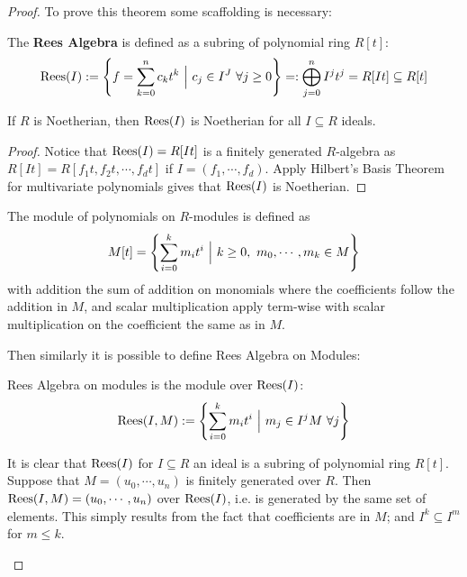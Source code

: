 \begin{proof}
    To prove this theorem some scaffolding is necessary:

    \begin{definition}
        The \textbf{Rees Algebra} is defined as a subring of polynomial ring $R[t]$:
        \[
            \mathrm{Rees}(I) := \left\{ f = \sum\limits_{k=0}^n c_k t^k \ \Big|\  c_j\in I^J\ \forall j \geq 0 \right\} =: \bigoplus\limits_{j=0}^n I^j t^j  = R[It] \subseteq R[t]
        \]
    \end{definition}

    \begin{proposition}\label{prop:Rees on Noeth is Noeth}
        If $R$ is Noetherian, then $\mathrm{Rees}(I)$ is Noetherian for all $I\subseteq R$ ideals. 
    \end{proposition}

    \begin{proof}
        Notice that $\mathrm{Rees}(I) = R[It]$ is a finitely generated $R$-algebra as $R[It] = R[f_1t, f_2t, \cdots, f_dt]$ if $I = (f_1, \cdots, f_d)$. Apply Hilbert's Basis Theorem for multivariate polynomials gives that $\mathrm{Rees}(I)$ is Noetherian.
    \end{proof}

    \begin{definition}
        The module of polynomials on $R$-modules is defined as
        \[
            M[t] = \left\{ \sum\limits_{i=0}^k m_i t^i \ \Big|\  k \geq 0,\ m_0, \cdots, m_k \in M \right\}
        \]
        with addition the sum of addition on monomials where the coefficients follow the addition in $M$, and scalar multiplication apply term-wise with scalar multiplication on the coefficient the same as in $M$. 
    \end{definition}

    Then similarly it is possible to define Rees Algebra on Modules:
    \begin{definition}
        Rees Algebra on modules is the module over $\mathrm{Rees}(I)$:
        \[
            \mathrm{Rees}(I, M) := \left\{ \sum\limits_{i=0}^k m_i t^i \ \Big|\  m_j\in I^j M \ \forall j \right\}
        \]
    \end{definition}

    \begin{remark}\label{rmk:Rees(I,M) Noeth if M Noeth}
        It is clear that $\mathrm{Rees}(I)$ for $I \subseteq R$ an ideal is a subring of polynomial ring $R[t]$. Suppose that $M = (u_0, \cdots, u_n)$ is finitely generated over $R$. Then $\mathrm{Rees}(I, M) = (u_0, \cdots, u_n)$ over $\mathrm{Rees}(I)$, i.e. is generated by the same set of elements. This simply results from the fact that coefficients are in $M$; and $I^{k}\subseteq I^m$ for $m\leq k$.


\end{remark}
\end{proof}
